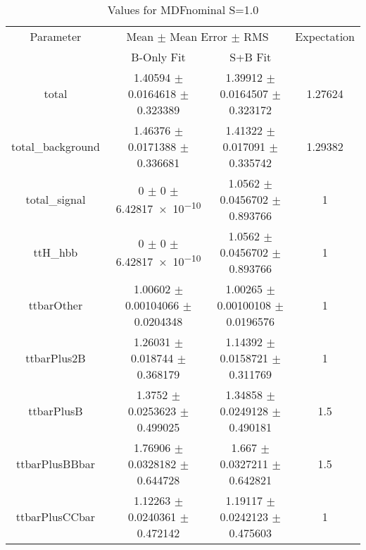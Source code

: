 \begin{table}
\centering
\caption{Values for MDFnominal S=1.0}
\begin{tabular}{cccc}
\toprule
Parameter & \multicolumn{2}{c}{Mean $\pm$ Mean Error $\pm$ RMS} & Expectation\\
 & B-Only Fit & S+B Fit & \\
\midrule
total & \num{1.40594} $\pm$ \num{0.0164618} $\pm$ \num{0.323389} & \num{1.39912} $\pm$ \num{0.0164507} $\pm$ \num{0.323172} & \num{1.27624}\\
total\_background & \num{1.46376} $\pm$ \num{0.0171388} $\pm$ \num{0.336681} & \num{1.41322} $\pm$ \num{0.017091} $\pm$ \num{0.335742} & \num{1.29382}\\
total\_signal & \num{0} $\pm$ \num{0} $\pm$ \num{6.42817e-10} & \num{1.0562} $\pm$ \num{0.0456702} $\pm$ \num{0.893766} & \num{1}\\
ttH\_hbb & \num{0} $\pm$ \num{0} $\pm$ \num{6.42817e-10} & \num{1.0562} $\pm$ \num{0.0456702} $\pm$ \num{0.893766} & \num{1}\\
ttbarOther & \num{1.00602} $\pm$ \num{0.00104066} $\pm$ \num{0.0204348} & \num{1.00265} $\pm$ \num{0.00100108} $\pm$ \num{0.0196576} & \num{1}\\
ttbarPlus2B & \num{1.26031} $\pm$ \num{0.018744} $\pm$ \num{0.368179} & \num{1.14392} $\pm$ \num{0.0158721} $\pm$ \num{0.311769} & \num{1}\\
ttbarPlusB & \num{1.3752} $\pm$ \num{0.0253623} $\pm$ \num{0.499025} & \num{1.34858} $\pm$ \num{0.0249128} $\pm$ \num{0.490181} & \num{1.5}\\
ttbarPlusBBbar & \num{1.76906} $\pm$ \num{0.0328182} $\pm$ \num{0.644728} & \num{1.667} $\pm$ \num{0.0327211} $\pm$ \num{0.642821} & \num{1.5}\\
ttbarPlusCCbar & \num{1.12263} $\pm$ \num{0.0240361} $\pm$ \num{0.472142} & \num{1.19117} $\pm$ \num{0.0242123} $\pm$ \num{0.475603} & \num{1}\\
\bottomrule
\end{tabular}
\end{table}